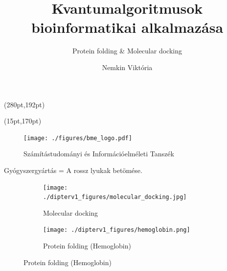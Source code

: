 \documentclass[aspectratio=169]{beamer}
\author[Nemkin Viktória, dr. Friedl Katalin]{Nemkin Viktória}
\institute[]{
\begin{small}Témavezető: dr. Friedl Katalin\end{small}
}
\title{Kvantumalgoritmusok bioinformatikai alkalmazása}
\subtitle{Protein folding \& Molecular docking}
\date{}
\begin{document}
\begin{frame}
\titlepage

\begin{textblock*}{150pt}(280pt,192pt) %

\end{textblock*}

\begin{textblock*}{180pt}(15pt,170pt) %
\begin{figure}[H]
\texttt{[image: ./figures/bme\_logo.pdf]}
\caption{Számítástudományi és Információelméleti Tanszék}
\end{figure}

\end{textblock*}

\end{frame}

\begin{frame}{Gyógyszergyártás = A rossz lyukak betömése.}


\begin{figure}[H]
  \centering
  \begin{subfigure}{.48\linewidth}
    \centering
    \texttt{[image: ./dipterv1\_figures/molecular\_docking.jpg]}
    \caption{Molecular docking}
  \end{subfigure}
  \begin{subfigure}{.4\linewidth}
    \centering
    \texttt{[image: ./dipterv1\_figures/hemoglobin.png]}
    \caption{Protein folding (Hemoglobin)}
  \end{subfigure}
\end{figure}

\end{frame}
\end{document}
